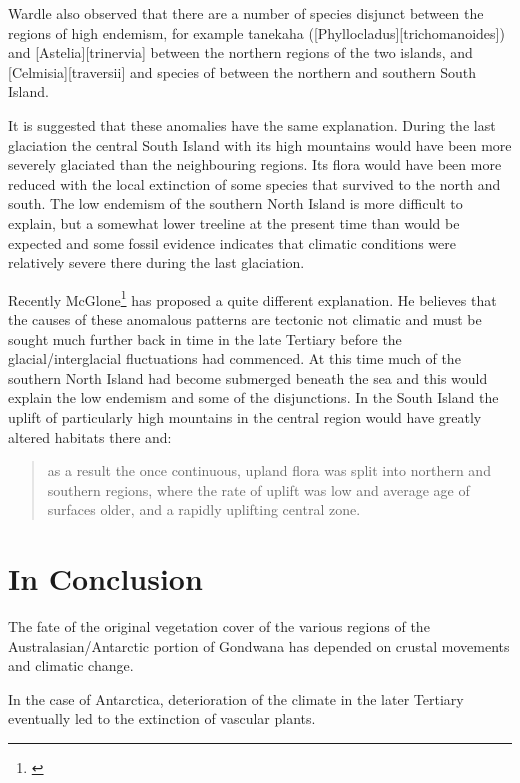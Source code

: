 Wardle also observed that there are a number of species disjunct between the regions of high endemism, for example tanekaha ([Phyllocladus][trichomanoides]) and [Astelia][trinervia] between the northern regions of the two islands, and [Celmisia][traversii] and species of  between the northern and southern South Island.

It is suggested that these anomalies have the same explanation.
During the last glaciation the central South Island with its high mountains would have been more severely glaciated than the neighbouring regions.
Its flora would have been more reduced with the local extinction of some species that survived to the north and south.
The low endemism of the southern North Island is more difficult to explain, but a somewhat lower treeline at the present time than would be expected and some fossil evidence indicates that climatic conditions were relatively severe there during the last glaciation.

Recently McGlone\footnote{\cite{mcglone1985plant}} has proposed a quite different explanation.
He believes that the causes of these anomalous patterns are tectonic not climatic and must be sought much further back in time in the late Tertiary before the glacial/interglacial fluctuations had commenced.
At this time much of the southern North Island had become submerged beneath the sea and this would explain the low endemism and some of the disjunctions.
In the South Island the uplift of particularly high mountains in the central region would have greatly altered habitats there and:

\begin{quote}
	as a result the once continuous, upland flora was split into northern and southern regions, where the rate of uplift was low and average age of surfaces older, and a rapidly uplifting central zone.
\end{quote}

\section{In Conclusion}

The fate of the original vegetation cover of the various regions of the Australasian/Antarctic portion of Gondwana has depended on crustal movements and climatic change.

In the case of Antarctica, deterioration of the climate in the later Tertiary eventually led to the extinction of vascular plants.

